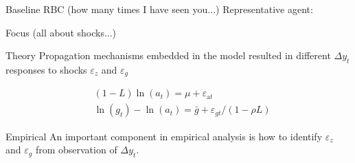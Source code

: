 \documentclass[10pt]{beamer}
\begin{document}
\begin{frame}{Baseline RBC (how many times I have seen you...)}
Representative agent: 

    
\end{frame}
%

\begin{frame}{Focus (all about shocks...)}
        \begin{exampleblock}{Theory}
            Propagation mechanisms embedded in the model resulted in different $\Delta y_t$ responses to shocks $\varepsilon_z$ and $\varepsilon_g$ 
        \end{exampleblock}
        \begin{align}
            &(1-L) \ln \left(a_{t}\right)=\mu+\varepsilon_{\mathrm{a} t} \\
            &\ln \left(g_{t}\right)-\ln \left(a_{t}\right)=\bar{g}+\varepsilon_{g t} /(1-\rho L) 
        \end{align}
     
        \begin{exampleblock}{Empirical}
        An important component in empirical analysis is how to identify $\varepsilon_z$ and $\varepsilon_g$ from observation of $\Delta y_t$.
    \end{exampleblock}
\end{frame}
\end{document}
